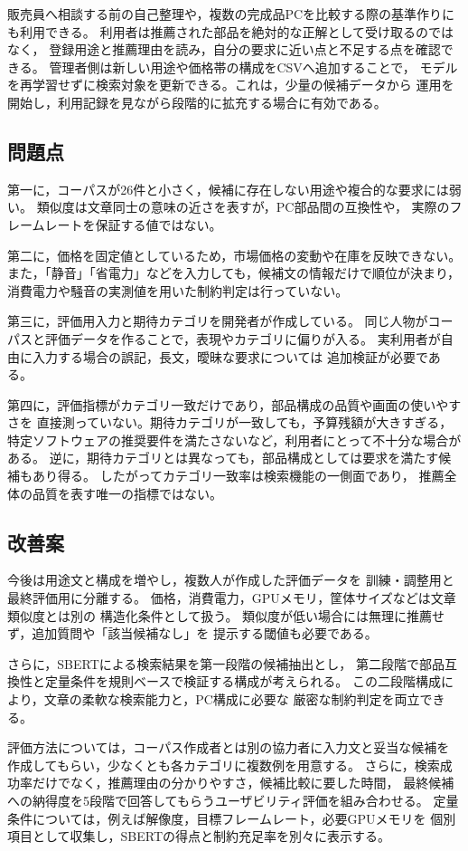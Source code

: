 \documentclass[a4paper,11pt]{article}
\begin{document}
販売員へ相談する前の自己整理や，複数の完成品PCを比較する際の基準作りにも利用できる。
利用者は推薦された部品を絶対的な正解として受け取るのではなく，
登録用途と推薦理由を読み，自分の要求に近い点と不足する点を確認できる。
管理者側は新しい用途や価格帯の構成をCSVへ追加することで，
モデルを再学習せずに検索対象を更新できる。これは，少量の候補データから
運用を開始し，利用記録を見ながら段階的に拡充する場合に有効である。

\subsection{問題点}
第一に，コーパスが26件と小さく，候補に存在しない用途や複合的な要求には弱い。
類似度は文章同士の意味の近さを表すが，PC部品間の互換性や，
実際のフレームレートを保証する値ではない。

第二に，価格を固定値としているため，市場価格の変動や在庫を反映できない。
また，「静音」「省電力」などを入力しても，候補文の情報だけで順位が決まり，
消費電力や騒音の実測値を用いた制約判定は行っていない。

第三に，評価用入力と期待カテゴリを開発者が作成している。
同じ人物がコーパスと評価データを作ることで，表現やカテゴリに偏りが入る。
実利用者が自由に入力する場合の誤記，長文，曖昧な要求については
追加検証が必要である。

第四に，評価指標がカテゴリ一致だけであり，部品構成の品質や画面の使いやすさを
直接測っていない。期待カテゴリが一致しても，予算残額が大きすぎる，
特定ソフトウェアの推奨要件を満たさないなど，利用者にとって不十分な場合がある。
逆に，期待カテゴリとは異なっても，部品構成としては要求を満たす候補もあり得る。
したがってカテゴリ一致率は検索機能の一側面であり，
推薦全体の品質を表す唯一の指標ではない。

\subsection{改善案}
今後は用途文と構成を増やし，複数人が作成した評価データを
訓練・調整用と最終評価用に分離する。
価格，消費電力，GPUメモリ，筐体サイズなどは文章類似度とは別の
構造化条件として扱う。
類似度が低い場合には無理に推薦せず，追加質問や「該当候補なし」を
提示する閾値も必要である。

さらに，SBERTによる検索結果を第一段階の候補抽出とし，
第二段階で部品互換性と定量条件を規則ベースで検証する構成が考えられる。
この二段階構成により，文章の柔軟な検索能力と，PC構成に必要な
厳密な制約判定を両立できる。

評価方法については，コーパス作成者とは別の協力者に入力文と妥当な候補を
作成してもらい，少なくとも各カテゴリに複数例を用意する。
さらに，検索成功率だけでなく，推薦理由の分かりやすさ，候補比較に要した時間，
最終候補への納得度を5段階で回答してもらうユーザビリティ評価を組み合わせる。
定量条件については，例えば解像度，目標フレームレート，必要GPUメモリを
個別項目として収集し，SBERTの得点と制約充足率を別々に表示する。
\end{document}
